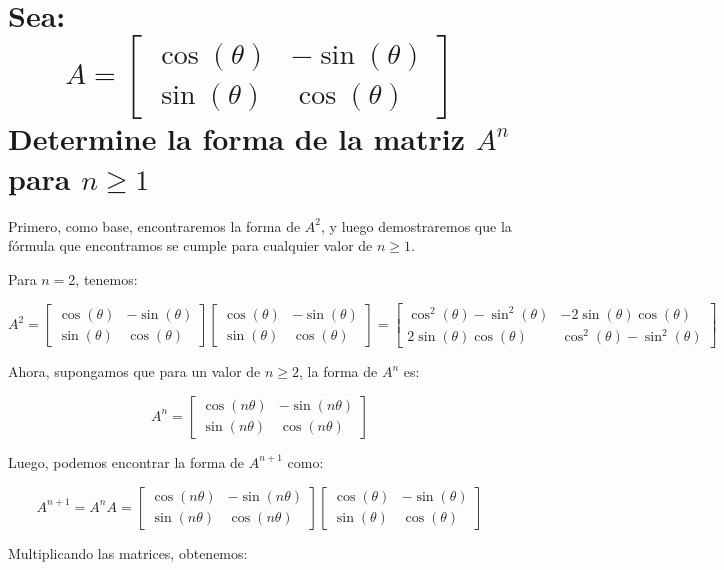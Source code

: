 \section{Sea:  $$A=\begin{bmatrix}\cos \left(\theta \right)&-\sin \left(\theta \right)\\ \sin \left(\theta \right)&\cos \left(\theta \right)\end{bmatrix}$$ Determine la forma de la matriz $A^n$ para $n \geq 1$}



Primero, como base, encontraremos la forma de $A^2$, y luego demostraremos que la fórmula que encontramos se cumple para cualquier valor de $n \geq 1$.

Para $n = 2$, tenemos:

$$A^2 = \begin{bmatrix}\cos(\theta) & -\sin(\theta) \\ \sin(\theta) & \cos(\theta)\end{bmatrix}\begin{bmatrix}\cos(\theta) & -\sin(\theta) \\ \sin(\theta) & \cos(\theta)\end{bmatrix} = \begin{bmatrix}\cos^2(\theta) - \sin^2(\theta) & -2\sin(\theta)\cos(\theta) \\ 2\sin(\theta)\cos(\theta) & \cos^2(\theta) - \sin^2(\theta)\end{bmatrix}$$

Ahora, supongamos que para un valor de $n \geq 2$, la forma de $A^n$ es:

$$A^n = \begin{bmatrix}\cos(n\theta) & -\sin(n\theta) \\ \sin(n\theta) & \cos(n\theta)\end{bmatrix}$$

Luego, podemos encontrar la forma de $A^{n+1}$ como:

$$A^{n+1} = A^nA = \begin{bmatrix}\cos(n\theta) & -\sin(n\theta) \\ \sin(n\theta) & \cos(n\theta)\end{bmatrix}\begin{bmatrix}\cos(\theta) & -\sin(\theta) \\ \sin(\theta) & \cos(\theta)\end{bmatrix}$$

Multiplicando las matrices, obtenemos:

